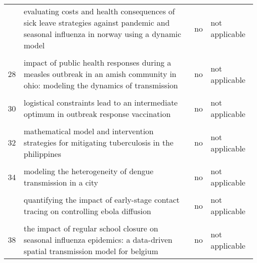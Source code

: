 \documentclass[
]{article}
\begin{document}
\begin{landscape}
\begin{longtable}{l>{\raggedright\arraybackslash}p{4cm}l>{\raggedright\arraybackslash}p{4cm}}
\addlinespace
26 & evaluating costs and health consequences of sick leave strategies against pandemic and seasonal influenza in norway using a dynamic model & no & not applicable\\
\cellcolor{gray!6}{27} & \cellcolor{gray!6}{evaluating vaccination strategies to control foot-and-mouth disease: a country comparison study} & \cellcolor{gray!6}{yes} & \cellcolor{gray!6}{yes}\\
28 & impact of public health responses during a measles outbreak in an amish community in ohio: modeling the dynamics of transmission & no & not applicable\\
\cellcolor{gray!6}{29} & \cellcolor{gray!6}{initial validation of a simulation model for estimating the impact of serogroup a neisseria meningitidis vaccination in the african meningitis belt} & \cellcolor{gray!6}{no} & \cellcolor{gray!6}{not applicable}\\
30 & logistical constraints lead to an intermediate optimum in outbreak response vaccination & no & not applicable\\
\addlinespace
\cellcolor{gray!6}{31} & \cellcolor{gray!6}{manipulation of contact network structure and the impact on foot-and-mouth disease transmission} & \cellcolor{gray!6}{no} & \cellcolor{gray!6}{not applicable}\\
32 & mathematical model and intervention strategies for mitigating tuberculosis in the philippines & no & not applicable\\
\cellcolor{gray!6}{33} & \cellcolor{gray!6}{measles outbreak response decision-making under uncertainty: a retrospective analysis} & \cellcolor{gray!6}{no} & \cellcolor{gray!6}{not applicable}\\
34 & modeling the heterogeneity of dengue transmission in a city & no & not applicable\\
\cellcolor{gray!6}{35} & \cellcolor{gray!6}{modelling the large-scale yellow fever outbreak in luanda, angola, and the impact of vaccination} & \cellcolor{gray!6}{no} & \cellcolor{gray!6}{not applicable}\\
\addlinespace
36 & quantifying the impact of early-stage contact tracing on controlling ebola diffusion & no & not applicable\\
\cellcolor{gray!6}{37} & \cellcolor{gray!6}{simulation of key interventions for seasonal influenza outbreak control at school in changsha, china} & \cellcolor{gray!6}{yes} & \cellcolor{gray!6}{no}\\
38 & the impact of regular school closure on seasonal influenza epidemics: a data-driven spatial transmission model for belgium & no & not applicable\\

\end{longtable}
\end{landscape}
\end{document}
